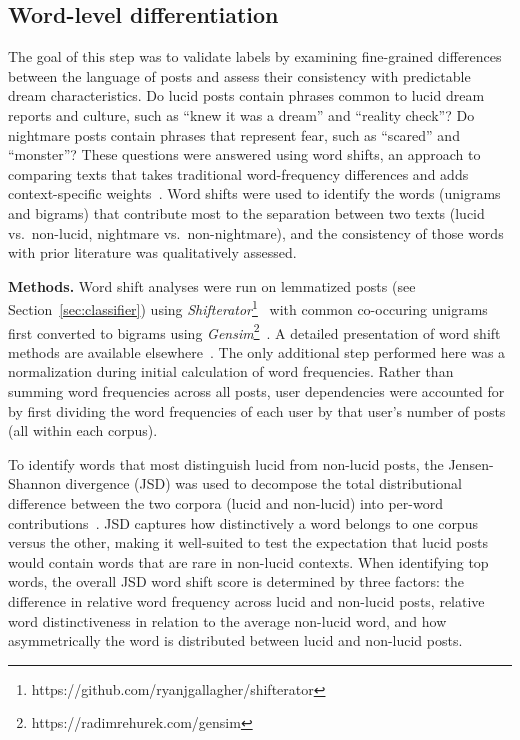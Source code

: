 \documentclass[10pt,a4paper,twocolumn]{article}
\begin{document}
\subsection{Word-level differentiation}\label{sec:wordshift}

The goal of this step was to validate labels by examining fine-grained differences between the language of posts and assess their consistency with predictable dream characteristics. Do lucid posts contain phrases common to lucid dream reports and culture, such as ``knew it was a dream'' and ``reality check''? Do nightmare posts contain phrases that represent fear, such as ``scared'' and ``monster''? These questions were answered using word shifts, an approach to comparing texts that takes traditional word-frequency differences and adds context-specific weights~\cite{gallagher2021}. Word shifts were used to identify the words (unigrams and bigrams) that contribute most to the separation between two texts (lucid vs.\ non-lucid, nightmare vs.\ non-nightmare), and the consistency of those words with prior literature was qualitatively assessed.

\smallskip
\noindent
\textbf{Methods.}
Word shift analyses were run on lemmatized posts (see Section~\ref{sec:classifier}) using \emph{Shifterator}\footnote{https://github.com/ryanjgallagher/shifterator}~\cite{gallagher2021} with common co-occuring unigrams first converted to bigrams using \emph{Gensim}\footnote{https://radimrehurek.com/gensim}~\cite{rehurek2010}. A detailed presentation of word shift methods are available elsewhere~\cite{gallagher2021}. The only additional step performed here was a normalization during initial calculation of word frequencies. Rather than summing word frequencies across all posts, user dependencies were accounted for by first dividing the word frequencies of each user by that user's number of posts (all within each corpus).

\par
To identify words that most distinguish lucid from non-lucid posts, the Jensen-Shannon divergence (JSD) was used to decompose the total distributional difference between the two corpora (lucid and non-lucid) into per-word contributions~\cite{gallagher2021,lin1991}. JSD captures how distinctively a word belongs to one corpus versus the other, making it well-suited to test the expectation that lucid posts would contain words that are rare in non-lucid contexts. When identifying top words, the overall JSD word shift score is determined by three factors: the difference in relative word frequency across lucid and non-lucid posts, relative word distinctiveness in relation to the average non-lucid word, and how asymmetrically the word is distributed between lucid and non-lucid posts.
\end{document}

